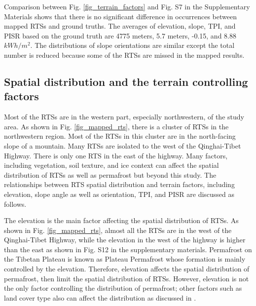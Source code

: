\documentclass[preprint,12pt,authoryear]{elsarticle}
\begin{document}
Comparison between Fig. \ref{fig_terrain_factors} and Fig. S7 in the Supplementary Materials shows that there is no significant difference in occurrences between mapped RTSs and ground truths. The averages of elevation, slope, TPI, and PISR based on the ground truth are 4775 meters, 5.7 meters, -0.15, and 8.88 $kWh/m^2$. The distributions of slope orientations are similar except the total number is reduced because some of the RTSs are missed in the mapped results. 

\subsection{Spatial distribution and the terrain controlling factors}
\label{subsec_rts_spatial}

Most of the RTSs are in the western part, especially northwestern, of the study area. As shown in Fig. \ref{fig_mapped_rts}, there is a cluster of RTSs in the northwestern region. Most of the RTSs in this cluster are in the north-facing slope of a mountain. Many RTSs are isolated to the west of the Qinghai-Tibet Highway. There is only one RTS in the east of the highway. Many factors, including vegetation, soil texture, and ice context can affect the spatial distribution of RTSs as well as permafrost but beyond this study. The relationships between RTS spatial distribution and terrain factors, including elevation, slope angle as well as orientation, TPI, and PISR are discussed as follows.





The elevation is the main factor affecting the spatial distribution of RTSs. As shown in Fig. \ref{fig_mapped_rts}, almost all the RTSs are in the west of the Qinghai-Tibet Highway, while the elevation in the west of the highway is higher than the east as shown in Fig. S12 in the supplementary materials. Permafrost on the Tibetan Plateau is known as Plateau Permafrost whose formation is mainly controlled by the elevation. Therefore, elevation affects the spatial distribution of permafrost, then limit the spatial distribution of RTSs. However, elevation is not the only factor controlling the distribution of permafrost; other factors such as land cover type also can affect the distribution as discussed in \citealp{yin2017effects}.
\end{document}
